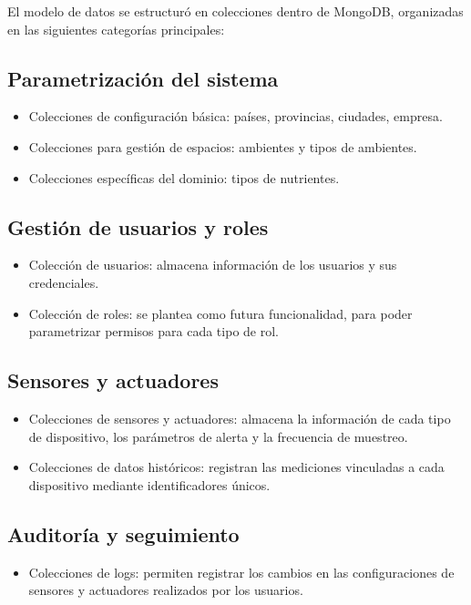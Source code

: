 El modelo de datos se estructuró en colecciones dentro de MongoDB, organizadas
en las siguientes categorías principales:

\subsection{Parametrización del sistema}

\begin{itemize}
    \item Colecciones de configuración básica: países, provincias, ciudades, empresa.
    \item Colecciones para gestión de espacios: ambientes y tipos de ambientes.
    \item Colecciones específicas del dominio: tipos de nutrientes.
\end{itemize}

\subsection{Gestión de usuarios y roles}

\begin{itemize}
    \item Colección de usuarios: almacena información de los usuarios y sus credenciales.
    \item Colección de roles: se plantea como futura funcionalidad, para poder
          parametrizar permisos para cada tipo de rol.
\end{itemize}

\subsection{Sensores y actuadores}
\begin{itemize}
    \item Colecciones de sensores y actuadores: almacena la información de cada tipo de
          dispositivo, los parámetros de alerta y la frecuencia de muestreo.
    \item Colecciones de datos históricos: registran las mediciones vinculadas a cada
          dispositivo mediante identificadores únicos.
\end{itemize}

\subsection{Auditoría y seguimiento}
\begin{itemize}
    \item Colecciones de logs: permiten registrar los cambios en las configuraciones de
          sensores y actuadores realizados por los usuarios.
\end{itemize}

